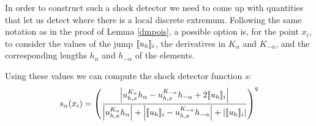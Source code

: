 In order to construct such a shock detector we need to come up with quantities that let us detect where there is a local discrete extremum. Following the same notation as in the proof of Lemma \ref{dmpois}, a possible option is, for the point $x_i$, to consider the values of the jump $\lbrack\!\lbrack u_h \rbrack\!\rbrack_i$, the derivatives in $K_{\alpha}$ and $K_{-\alpha}$, and the corresponding lengths $h_\alpha$ and $h_{{-\alpha}}$ of the elements.
\begin{figure}
\centering
{}%
\caption{}
\end{figure}
Using these values we can compute the shock detector function $s$: 
\begin{align*}
s_\alpha(x_i) = \left(\frac{\left|u_{h,x}^{K_\alpha} h_\alpha -u_{h,x}^{K_{-\alpha}}h_{{-\alpha}}+2\lbrack\!\lbrack u_h \rbrack\!\rbrack_i\right|}{\left|u_{h,x}^{K_\alpha} h_\alpha  \right|+ \left| \lbrack\!\lbrack u_h \rbrack\!\rbrack_i - u_{h,x}^{K_{-\alpha}}h_{{-\alpha}}  \right|+ \left|\lbrack\!\lbrack u_h \rbrack\!\rbrack_i\right|}\right)^q
\end{align*}

